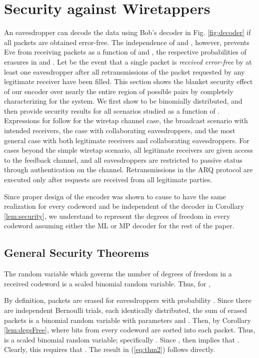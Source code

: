 \documentclass[10pt,twocolumn,twoside]{IEEEtran} \newlength{\pic}
\theoremstyle{definition}
\theoremstyle{remark}
\theoremstyle{plain}
\begin{document}
\section{Security against Wiretappers}\label{sec:analysis}

An eavesdropper can decode the data using Bob's decoder in Fig. \ref{fig:decoder} if all packets are obtained error-free. The independence of  and , however, prevents Eve from receiving packets as a function of  and , the respective probabilities of erasures in  and . Let  be the event that a single packet is \emph{received error-free} by at least one eavesdropper after all retransmissions of the packet requested by any legitimate receiver have been filled. This section shows the blanket security effect of our encoder over nearly the entire region of possible  pairs by completely characterizing  for the system. We first show  to be binomially distributed, and then provide security results for all scenarios studied as a function of . Expressions for  follow for the wiretap channel case, the broadcast scenario with  intended receivers, the case with  collaborating eavesdroppers, and the most general case with both  legitimate receivers and  collaborating eavesdroppers. For cases beyond the simple wiretap scenario, all  legitimate receivers are given access to the feedback channel, and all  eavesdroppers are restricted to passive status through authentication on the channel. Retransmissions in the ARQ protocol are executed only after requests are received from all legitimate parties.

Since proper design of the encoder was shown to cause  to have the same realization for every codeword and be independent of the decoder in Corollary \ref{lem:security}, we understand  to represent the degrees of freedom in every codeword assuming either the ML or MP decoder for the rest of the paper.

\subsection{General Security Theorems}

\begin{lemma}\label{lem:DisBinomial}
 The random variable  which governs the number of degrees of freedom in a received codeword is a scaled binomial random variable. Thus, for ,
 
\end{lemma}
\begin{IEEEproof}
 By definition, packets are erased for eavesdroppers with probability . Since there are  independent Bernoulli trials, each identically distributed, the sum of erased packets  is a binomial random variable with parameters  and  \cite{Grimmett_ProbBook}. Then, by Corollary \ref{lem:degsFree},  where  bits from every codeword are sorted into each packet. Thus,  is a scaled binomial random variable; specifically . Since , then  implies that . Clearly, this requires that . The result in (\ref{eq:thm2}) follows directly.
\end{IEEEproof}
\end{document}
